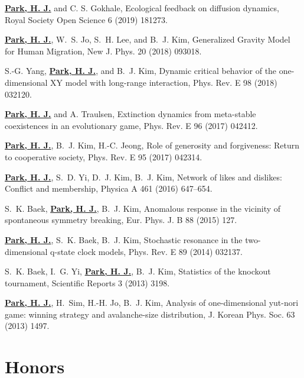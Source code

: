\documentclass[11pt,a4paper,sans]{moderncv}        %
\begin{document}
\begin{etaremune}
\item
\underline{\textbf{Park, H. J.}} and C. S. Gokhale,
Ecological feedback on diffusion dynamics, Royal Society Open Science 6 (2019) 181273.


\item
\underline{\textbf{Park, H. J.}}, W.~S. Jo, S.~H. Lee, and B.~J. Kim,
Generalized Gravity Model for Human Migration, New J. Phys. 20 (2018) 093018.


\item
S.-G. Yang, \underline{\textbf{Park, H. J.}}, and B.~J. Kim,
Dynamic critical behavior of the one-dimensional XY model with long-range interaction, Phys. Rev. E 98 (2018) 032120.


\item
\underline{\textbf{Park, H. J.}} and A. Traulsen,
Extinction dynamics from meta-stable coexistences in an evolutionary game, 
Phys. Rev. E 96 (2017) 042412.


\item
\underline{\textbf{Park, H. J.}}, B.~J. Kim, H.-C. Jeong, Role of generosity
  and forgiveness: Return to cooperative society, Phys. Rev. E 95 (2017)
  042314.

\item
\underline{\textbf{Park, H. J.}}, S.~D. Yi, D.~J. Kim, B.~J. Kim, Network of
  likes and dislikes: Conflict and membership, Physica A 461 (2016) 647--654.

\item
S.~K. Baek, \underline{\textbf{Park, H. J.}}, B.~J. Kim, Anomalous response in
  the vicinity of spontaneous symmetry breaking, Eur. Phys. J. B 88 (2015) 127.

\item
\underline{\textbf{Park, H. J.}}, S.~K. Baek, B.~J. Kim, Stochastic resonance
  in the two-dimensional q-state clock models, Phys. Rev. E 89 (2014) 032137.

\item
S.~K. Baek, I.~G. Yi, \underline{\textbf{Park, H. J.}}, B.~J. Kim, Statistics
  of the knockout tournament, Scientific Reports 3 (2013) 3198.

\item
\underline{\textbf{Park, H. J.}}, H.~Sim, H.-H. Jo, B.~J. Kim, Analysis of
  one-dimensional yut-nori game: winning strategy and avalanche-size
  distribution, J. Korean Phys. Soc. 63 (2013) 1497.

\end{etaremune}

\section{Honors}
\end{document}
